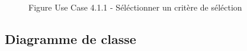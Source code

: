 \documentclass[a4paper, 11pt]{article}
\begin{document}
	\clearpage
	\begin{figure}[h]
        \caption{Figure Use Case 4.1.1 - Séléctionner un critère de séléction}
        \label{fig-diag-use-case-4-1-1}
        \end{figure}
	\clearpage
        \subsection{ Diagramme de classe}
\end{document}
